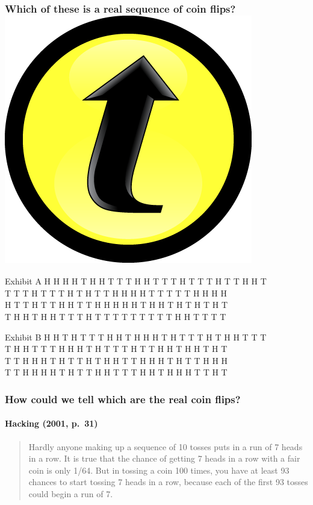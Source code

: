 \documentclass[handout]{beamer}
\begin{document}
\begin{frame}[fragile]
\frametitle{Which of these is a real sequence of coin flips? \hfill \includegraphics[scale = 0.05]{./images/clicker}}
\small
\begin{block}{Exhibit A}
H H H H T H H T T T H H T T T H T T T H T T H H T \\
T T T H T T T H T H T T H H H H T T T T T H H H H \\
H T T H T T H H T T H H H H H T H H T H T H T H T \\
T H H T H H T T T H T T T T T T T T T H H T T T T 
\end{block}

\begin{block}{Exhibit B}
H H T H T T T H H T H H H T H T T T H T H H T T T\\
T H H T T T H H H T H T T T H T T H H T H H T H T\\
T T H H H T H T T H T H H T	T H H H T H T T H H H\\
T T H H H H T H T T H H T T T H H T H H H T T H T
\end{block}
\end{frame}
\begin{frame}
\frametitle{How could we tell which are the real coin flips?}
\framesubtitle{Hacking (2001, p.\ 31)}
	\begin{quote}
	Hardly anyone making up a sequence of 10 tosses puts in a run of 7 heads in a row. It is true that the chance of getting 7 heads in a row with a fair coin is only 1/64. But in tossing a coin 100 times, you have at least 93 chances to start tossing 7 heads in a row, because \alert{each of the first 93 tosses could begin a run of 7.}
	\end{quote}
\end{frame}
\end{document}

